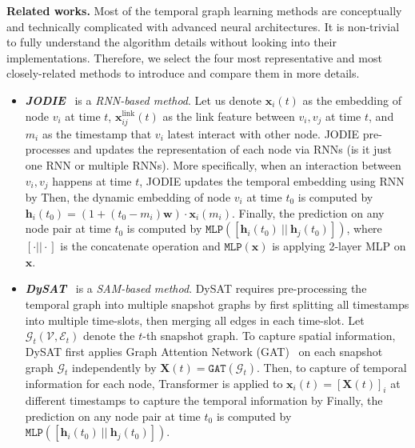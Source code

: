 \noindent\textbf{Related works.} 
Most of the temporal graph learning methods are conceptually and technically complicated with advanced neural architectures.
It is non-trivial to fully understand the algorithm details without looking into their implementations.
Therefore, we select the four most representative and most closely-related methods to introduce and compare them in more details.
\begin{itemize} [noitemsep,topsep=0pt,leftmargin=5mm ]
\item \noindent\textit{\textbf{JODIE}}~\cite{kumar2019predicting} is a \emph{RNN-based method}.
Let us denote $\mathbf{x}_i(t)$ as the embedding of node $v_i$ at time $t$, $\mathbf{x}_{ij}^\text{link}(t)$ as the link feature between $v_i,v_j$ at time $t$, and $m_i$ as the timestamp that $v_i$ latest interact with other node.
JODIE pre-processes and updates the representation of each node via RNNs (is it just one RNN or multiple RNNs).
More specifically, when an interaction between $v_i, v_j$ happens at time $t$, JODIE updates the temporal embedding using RNN by
Then, the dynamic embedding of node $v_i$ at time $t_0$ is computed by $\mathbf{h}_i(t_0) = \left(1 + (t_0-m_i) \mathbf{w} \right) \cdot \mathbf{x}_i(m_i)$.
Finally, the prediction on any node pair at time $t_0$ is computed by $\texttt{MLP}([\mathbf{h}_i(t_0)~||~ \mathbf{h}_j(t_0)]) $, where $[\cdot||\cdot]$ is the concatenate operation and $\texttt{MLP}(\mathbf{x})$ is applying 2-layer MLP on $\mathbf{x}$.

\item \noindent\textit{\textbf{DySAT}}~\cite{sankar2020dysat} is a \emph{SAM-based method}. DySAT requires pre-processing the temporal graph into multiple snapshot graphs by first splitting all timestamps into multiple time-slots, then merging all edges in each time-slot.
Let $\mathcal{G}_t(\mathcal{V}, \mathcal{E}_t)$ denote the $t$-th snapshot graph. 
To capture spatial information, DySAT first applies Graph Attention Network (GAT)~\cite{velivckovic2018graph} on each snapshot graph $\mathcal{G}_t$ independently by $\mathbf{X}(t) = \texttt{GAT}(\mathcal{G}_t)$.
Then, to capture of temporal information for each node, Transformer is applied to $\mathbf{x}_i(t) = [\mathbf{X}(t)]_i$ at different timestamps to capture the temporal information by
Finally, the prediction on any node pair at time $t_0$ is computed by $\texttt{MLP}([\mathbf{h}_i(t_0)~||~ \mathbf{h}_j(t_0)]) $. 


\end{itemize}
